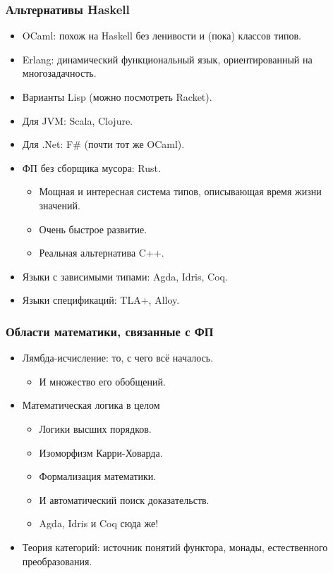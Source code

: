 \documentclass[11pt]{beamer}
\begin{document}
\begin{frame}[fragile]
  \frametitle{Альтернативы Haskell}
  \begin{itemize}
    \item OCaml: похож на Haskell без ленивости и (пока) классов типов.
    \item Erlang: динамический функциональный язык, ориентированный на многозадачность.
    \item Варианты Lisp (можно посмотреть Racket).
          \pause
    \item Для JVM: Scala, Clojure.
    \item Для .Net: F\# (почти тот же OCaml).
          \pause
    \item ФП без сборщика мусора: Rust.
          \begin{itemize}
            \item Мощная и интересная система типов, описывающая время жизни значений.
            \item Очень быстрое развитие.
            \item Реальная альтернатива C++.
          \end{itemize}
          \pause
    \item Языки с зависимыми типами: Agda, Idris, Coq.
          \pause
    \item Языки спецификаций: TLA+, Alloy.
  \end{itemize}
\end{frame}

\begin{frame}[fragile]
  \frametitle{Области математики, связанные с ФП}
  \begin{itemize}
    \item Лямбда-исчисление: то, с чего всё началось.
          \begin{itemize}
            \item И множество его обобщений.
          \end{itemize}
          \pause
    \item Математическая логика в целом
          \begin{itemize}
            \item Логики высших порядков.
            \item Изоморфизм Карри-Ховарда.
            \item Формализация математики.
            \item И автоматический поиск доказательств.
            \item Agda, Idris и Coq сюда же!
          \end{itemize}
          \pause
    \item Теория категорий: источник понятий функтора, монады, естественного преобразования.
  \end{itemize}
\end{frame}
\end{document}
